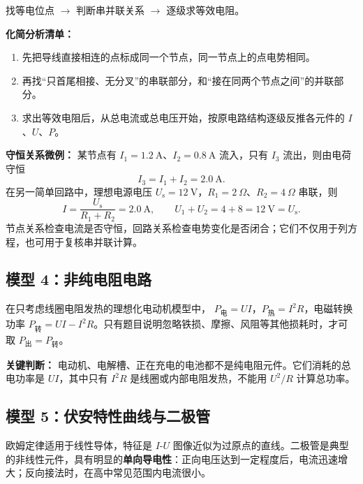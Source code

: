 找等电位点 $\to$ 判断串并联关系 $\to$ 逐级求等效电阻。

\textbf{化简分析清单：}
\begin{enumerate}
  \item 先把导线直接相连的点标成同一个节点，同一节点上的点电势相同。
  \item 再找“只首尾相接、无分叉”的串联部分，和“接在同两个节点之间”的并联部分。
  \item 求出等效电阻后，从总电流或总电压开始，按原电路结构逐级反推各元件的 $I$、$U$、$P$。
\end{enumerate}

\textbf{守恒关系微例：} 某节点有 $I_1=1.2\ \mathrm A$、$I_2=0.8\ \mathrm A$ 流入，只有 $I_3$ 流出，则由电荷守恒
\[
I_3=I_1+I_2=2.0\ \mathrm A.
\]
在另一简单回路中，理想电源电压 $U_{\mathrm s}=12\ \mathrm V$，$R_1=2\ \Omega$、$R_2=4\ \Omega$ 串联，则
\[
I=\frac{U_{\mathrm s}}{R_1+R_2}=2.0\ \mathrm A,\qquad
U_1+U_2=4+8=12\ \mathrm V=U_{\mathrm s}.
\]
节点关系检查电流是否守恒，回路关系检查电势变化是否闭合；它们不仅用于列方程，也可用于复核串并联计算。

\subsection*{模型 4：非纯电阻电路}

在只考虑线圈电阻发热的理想化电动机模型中，
$P_{\text{电}} = UI$，$P_{\text{热}} = I^2R$，电磁转换功率
$P_{\text{转}} = UI - I^2R$。只有题目说明忽略铁损、摩擦、风阻等其他损耗时，才可取 $P_{\text{出}}=P_{\text{转}}$。

\begin{center}


\label{fig:non-ohmic-motor-model}
\end{center}

\textbf{关键判断：} 电动机、电解槽、正在充电的电池都不是纯电阻元件。它们消耗的总电功率是 $UI$，其中只有 $I^2R$ 是线圈或内部电阻发热，不能用 $U^2/R$ 计算总功率。

\subsection*{模型 5：伏安特性曲线与二极管}

欧姆定律适用于线性导体，特征是 $I$-$U$ 图像近似为过原点的直线。二极管是典型的非线性元件，具有明显的\textbf{单向导电性}：正向电压达到一定程度后，电流迅速增大；反向接法时，在高中常见范围内电流很小。

